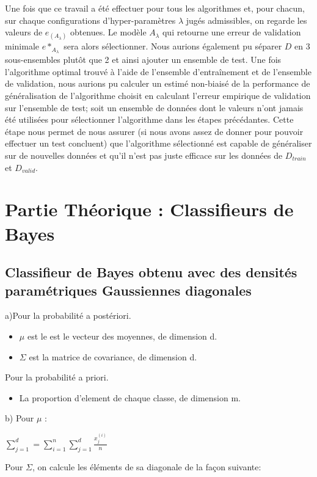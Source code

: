 \documentclass[a4paper,10pt]{article}
\begin{document}
Une fois que ce travail a été effectuer pour tous les algorithmes et, pour chacun, sur chaque configurations d'hyper-paramètres $\lambda$ jugés admissibles, on regarde les valeurs de $e_{(A_{\lambda})}$ obtenues. Le modèle $A_{\lambda}$ qui retourne une erreur de validation minimale $e*_{A_{\lambda}}$ sera alors sélectionner. 
Nous aurions également pu séparer $D$ en 3 sous-ensembles plutôt que 2 et ainsi ajouter un ensemble de test. Une fois l'algorithme optimal trouvé à l'aide de l'ensemble d'entraînement et de l'ensemble de validation, nous aurions pu calculer un estimé non-biaisé de la performance de généralisation de l'algorithme choisit en calculant l'erreur empirique de validation sur l'ensemble de test; soit un ensemble de données dont le valeurs n'ont jamais été utilisées pour sélectionner l'algorithme dans les étapes précédantes. Cette étape nous permet de nous assurer (si nous avons assez de donner pour pouvoir effectuer un test concluent) que l'algorithme sélectionné est capable de généraliser sur de nouvelles données et qu'il n'est pas juste efficace sur les données de $D_{train}$ et $D_{valid}$.



\section{Partie Théorique : Classifieurs de Bayes}

\subsection{Classifieur de Bayes obtenu avec des densités paramétriques Gaussiennes diagonales}

a)Pour la probabilité a postériori.
\begin{itemize}
	\item $\mu$ est le est le vecteur des moyennes, de dimension d.
	\item $\Sigma$ est la matrice de covariance, de dimension d.
\end{itemize}
Pour la probabilité a priori.
\begin{itemize}
	\item La proportion d'element de chaque classe, de dimension m.
\end{itemize}

b)
Pour $\mu$ :

$\sum_{j=1}^{d} = \sum_{i=1}^{n}\sum_{j=1}^{d} \frac{x_{j}^{(i)}}{n}$

Pour $\Sigma$, on calcule les éléments de sa diagonale de la façon suivante:
\end{document}
